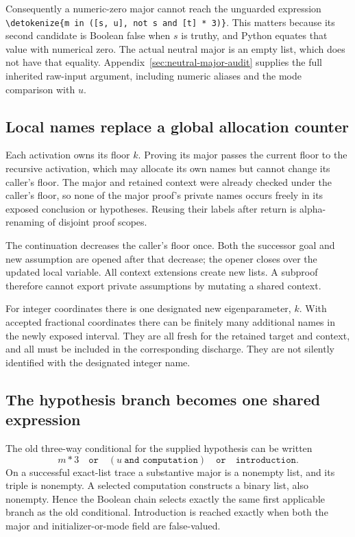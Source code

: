 \documentclass[11pt,letterpaper]{article}
\theoremstyle{definition}\newtheorem{definition}[theorem]{Definition}
\theoremstyle{remark}\newtheorem{remark}[theorem]{Remark}
\newcommand{\file}[1]{\expandafter\nolinkurl\expandafter{\detokenize{#1}}}
\begin{document}
Consequently a numeric-zero major cannot reach the unguarded expression
\file{m in ([s, u], not s and [t] * 3)}. This matters because its second
candidate is Boolean false when $s$ is truthy, and Python equates that value
with numerical zero. The actual neutral major is an empty list, which does
not have that equality. Appendix~\ref{sec:neutral-major-audit} supplies the
full inherited raw-input argument, including numeric aliases and the mode
comparison with $u$.

\subsection{Local names replace a global allocation counter}

Each activation owns its floor $k$. Proving its major passes the current
floor to the recursive activation, which may allocate its own names but cannot
change its caller's floor. The major and retained context were already checked
under the caller's floor, so none of the major proof's private names occurs
freely in its exposed conclusion or hypotheses. Reusing their labels after
return is alpha-renaming of disjoint proof scopes.

The continuation decreases the caller's floor once. Both the successor goal
and new assumption are opened after that decrease; the opener closes over the
updated local variable. All context extensions create new lists. A subproof
therefore cannot export private assumptions by mutating a shared context.

For integer coordinates there is one designated new eigenparameter, $k$.
With accepted fractional coordinates there can be finitely many additional
names in the newly exposed interval. They are all fresh for the retained
target and context, and all must be included in the corresponding discharge.
They are not silently identified with the designated integer name.

\subsection{The hypothesis branch becomes one shared expression}

The old three-way conditional for the supplied hypothesis can be written
\[
 m*3\quad\texttt{or}\quad(u\ \texttt{and computation})
       \quad\texttt{or}\quad\texttt{introduction}.
\]
On a successful exact-list trace a substantive major is a nonempty list,
and its triple is nonempty. A selected computation constructs a binary list,
also nonempty. Hence the Boolean chain selects exactly the same first
applicable branch as the old conditional. Introduction is reached exactly
when both the major and initializer-or-mode field are false-valued.
\end{document}
